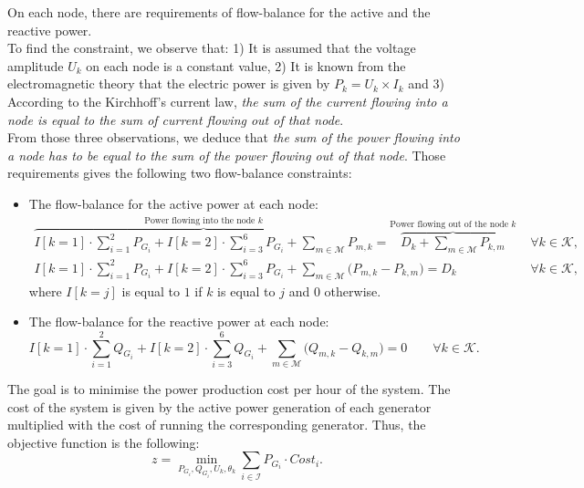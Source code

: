 \vspace{3mm}
On each node, there are requirements of flow-balance for the active and the reactive power. \\
To find the constraint, we observe that: 1) It is assumed that the voltage amplitude $U_k$ on each node is a constant value, 2) It is known from the electromagnetic theory that the electric power is given by $P_k = U_k\times I_k$ and 3) According to the Kirchhoff's current law, \textit{the sum of the current flowing into a node is equal to the sum of current flowing out of that node}. \\
From those three observations, we deduce that \textit{the sum of the power flowing into a node has to be equal to the sum of the power flowing out of that node}. Those requirements gives the following two flow-balance constraints: 
\begin{itemize}
    \item The flow-balance for the active power at each node:
    \begin{align*}
        \overbrace{I[k = 1] \cdot \sum_{i = 1}^{2} P_{G_i} + I[k = 2] \cdot \sum_{i = 3}^{6} P_{G_i} + \sum_{m \in \mathcal{M}} P_{m,k}}^{\text{Power flowing into the node }k} = \overbrace{ D_k + \sum_{m \in \mathcal{M}} P_{k,m} }^{\text{Power flowing out of the node }k} &\qquad \forall k \in \mathcal{K},\\
        I[k = 1] \cdot \sum_{i = 1}^{2} P_{G_i} + I[k = 2] \cdot \sum_{i = 3}^{6} P_{G_i} + \sum_{m \in \mathcal{M}} \big( P_{m,k} - P_{k,m} \big) = D_k &\qquad \forall k \in \mathcal{K},
    \end{align*}
    where $I[k=j]$ is equal to $1$ if $k$ is equal to $j$ and $0$ otherwise.
    
    \item The flow-balance for the reactive power at each node:
    \begin{equation*}
        I[k = 1] \cdot \sum_{i = 1}^{2} Q_{G_i} + I[k = 2] \cdot \sum_{i = 3}^{6} Q_{G_i} + \sum_{m \in \mathcal{M}} \big( Q_{m,k} - Q_{k,m} \big) = 0 \qquad \forall k \in \mathcal{K}.
    \end{equation*}
\end{itemize}

\vspace{3mm}
The goal is to minimise the power production cost per hour of the system. The cost of the system is given by the active power generation of each generator multiplied with the cost of running the corresponding generator. Thus, the objective function is the following:
\begin{equation*}
    z = \min_{P_{G_i}, Q_{G_i}, U_k, \theta_k} \sum_{i \in \mathcal{I}} P_{G_i} \cdot Cost_i.
\end{equation*}

